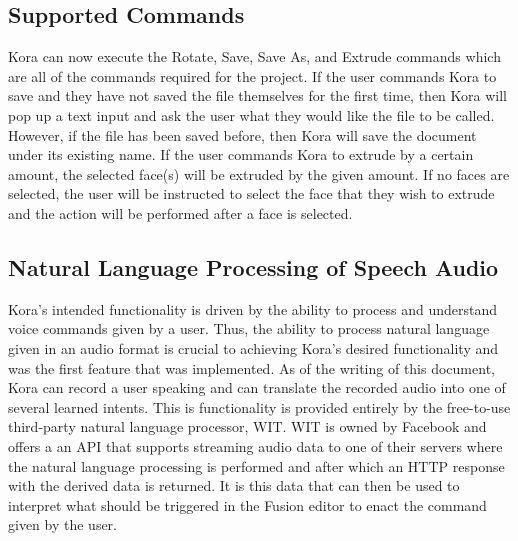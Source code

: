 \documentclass[onecolumn, draftclsnofoot,10pt, compsoc]{IEEEtran}
\begin{document}
	\subsection{Supported Commands}
		Kora can now execute the Rotate, Save, Save As, and Extrude commands which are all of the commands required for the project.
		If the user commands Kora to save and they have not saved the file themselves for the first time, then Kora will pop up a text input and ask the user what they would like the file to be called.
		However, if the file has been saved before, then Kora will save the document under its existing name.
		If the user commands Kora to extrude by a certain amount, the selected face(s) will be extruded by the given amount.
		If no faces are selected, the user will be instructed to select the face that they wish to extrude and the action will be performed after a face is selected.
		
	\subsection{Natural Language Processing of Speech Audio}
		Kora's intended functionality is driven by the ability to process and understand voice commands given by a user.
		Thus, the ability to process natural language given in an audio format is crucial to achieving Kora's desired functionality and was the first feature that was implemented.
		As of the writing of this document, Kora can record a user speaking and can translate the recorded audio into one of several learned intents.
		This is functionality is provided entirely by the free-to-use third-party natural language processor, WIT.
		WIT is owned by Facebook and offers a an API that supports streaming audio data to one of their servers where the natural language processing is performed and after which an HTTP response with the derived data is returned.
		It is this data that can then be used to interpret what should be triggered in the Fusion editor to enact the command given by the user.
\end{document}
